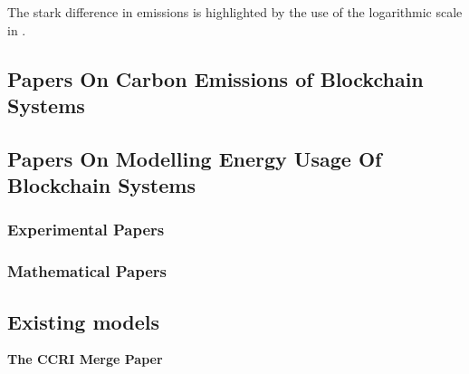 The stark difference in emissions is highlighted by the use of the logarithmic scale in . 












\subsection{Papers On Carbon Emissions of Blockchain Systems}



\subsection{Papers On Modelling Energy Usage Of Blockchain Systems}



\subsubsection{Experimental Papers}




\subsubsection{Mathematical Papers}



\subsection{ Existing models }
\label{LitRevExistingModels}
\textbf{The CCRI Merge Paper } \cite{CryptoCarbonRatingsInstitute2022TheNetwork}

